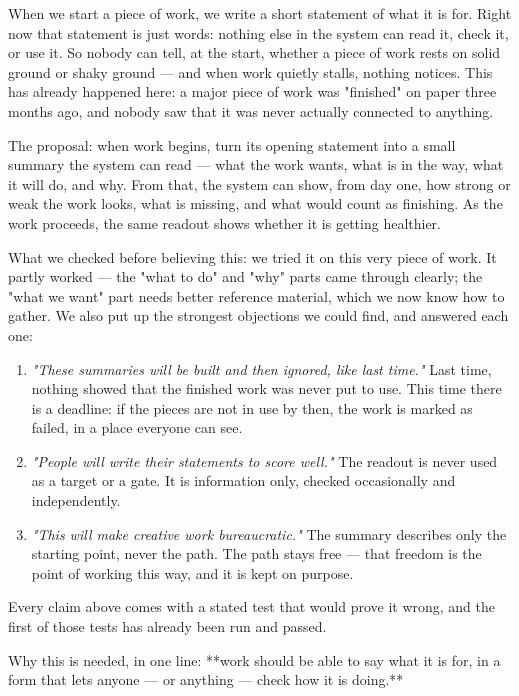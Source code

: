 \documentclass[11pt,oneside]{article}
\begin{document}
\begin{subbox}[title={4.1 Plain-language argument (the version anyone can read)}]

When we start a piece of work, we write a short statement of what it is for.
Right now that statement is just words: nothing else in the system can read
it, check it, or use it. So nobody can tell, at the start, whether a piece of
work rests on solid ground or shaky ground --- and when work quietly stalls,
nothing notices. This has already happened here: a major piece of work was
"finished" on paper three months ago, and nobody saw that it was never
actually connected to anything.

The proposal: when work begins, turn its opening statement into a small
summary the system can read --- what the work wants, what is in the way, what
it will do, and why. From that, the system can show, from day one, how strong
or weak the work looks, what is missing, and what would count as finishing.
As the work proceeds, the same readout shows whether it is getting healthier.

What we checked before believing this: we tried it on this very piece of
work. It partly worked --- the "what to do" and "why" parts came through
clearly; the "what we want" part needs better reference material, which we
now know how to gather. We also put up the strongest objections we could
find, and answered each one:

\begin{enumerate}[leftmargin=1.4em,itemsep=1pt]
\item \emph{"These summaries will be built and then ignored, like last time."} Last time, nothing showed that the finished work was never put to use. This time there is a deadline: if the pieces are not in use by then, the work is marked as failed, in a place everyone can see.
\item \emph{"People will write their statements to score well."} The readout is never used as a target or a gate. It is information only, checked occasionally and independently.
\item \emph{"This will make creative work bureaucratic."} The summary describes only the starting point, never the path. The path stays free --- that freedom is the point of working this way, and it is kept on purpose.
\end{enumerate}

Every claim above comes with a stated test that would prove it wrong, and the
first of those tests has already been run and passed.

Why this is needed, in one line: **work should be able to say what it is for,
in a form that lets anyone --- or anything --- check how it is doing.**

\end{subbox}
\end{document}
